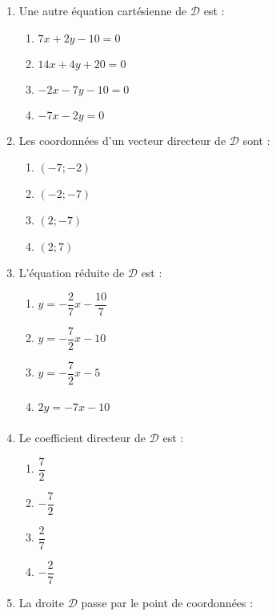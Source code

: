 \documentclass[a4paper]{article}
\begin{document}
\begin{enumerate}
  \item Une autre équation cartésienne de $\mathcal{D}$ est :
    \begin{multicols}{4}
      \begin{enumerate}
	\item $7x+2y-10=0$
	\item $14x+4y+20=0$
	\item $-2x-7y-10=0$
	\item $-7x-2y=0$
      \end{enumerate}
    \end{multicols}
  \item Les coordonnées d'un vecteur directeur de $\mathcal{D}$ sont :
    \begin{multicols}{4}
      \begin{enumerate}
	\item $(-7;-2)$
	\item $(-2;-7)$
	\item $(2;-7)$
	\item $(2;7)$
      \end{enumerate}
    \end{multicols}
  \item L'équation réduite de $\mathcal{D}$ est :
    \begin{multicols}{4}
      \begin{enumerate}
	\item $y=-\dfrac{2}{7}x-\dfrac{10}{7}$
	\item $y=-\dfrac{7}{2}x-10$
	\item $y=-\dfrac{7}{2}x-5$
	\item $2y=-7x-10\phantom{\dfrac{7}{2}}$
      \end{enumerate}
    \end{multicols}
  \item Le coefficient directeur de $\mathcal{D}$ est :
    \begin{multicols}{4}
      \begin{enumerate}
	\item $\dfrac{7}{2}$
	\item $-\dfrac{7}{2}$
	\item $\dfrac{2}{7}$
	\item $-\dfrac{2}{7}$
      \end{enumerate}
    \end{multicols}
  \item La droite $\mathcal{D}$ passe par le point de coordonnées :
  \begin{multicols}{4}

\end{multicols}
\end{enumerate}
\end{document}
